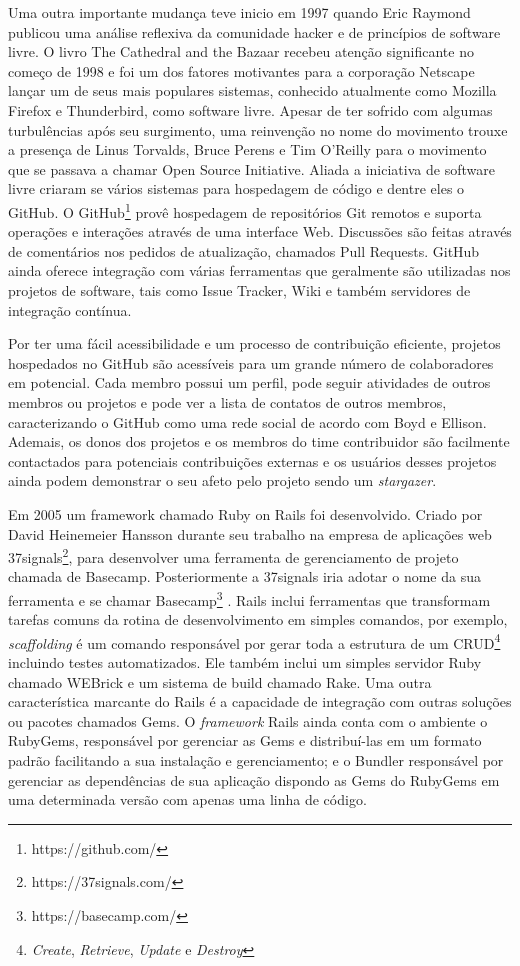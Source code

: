 Uma outra importante mudança teve inicio em 1997 quando Eric Raymond publicou uma análise reflexiva da comunidade hacker e de princípios de software livre. O livro The Cathedral and the Bazaar \cite{Raymond:2001:CBM:365399} recebeu atenção significante no começo de 1998 e foi um dos fatores motivantes para a corporação Netscape lançar um de seus mais populares sistemas, conhecido atualmente como Mozilla Firefox e Thunderbird, como software livre. Apesar de ter sofrido com algumas turbulências após seu surgimento, uma reinvenção no nome do movimento trouxe a presença de Linus Torvalds, Bruce Perens e Tim O'Reilly para o movimento que se passava a chamar Open Source Initiative\cite{osi2012}. Aliada a iniciativa de software livre criaram se vários sistemas para hospedagem de código e dentre eles o GitHub. O GitHub\footnote{https://github.com/} provê hospedagem de repositórios Git remotos e suporta operações e interações através de uma interface Web. Discussões são feitas através de comentários nos pedidos de atualização, chamados Pull Requests. GitHub ainda oferece integração com várias ferramentas que geralmente são utilizadas nos projetos de software, tais como Issue Tracker, Wiki e também servidores de integração contínua.

Por ter uma fácil acessibilidade e um processo de contribuição eficiente, projetos hospedados no GitHub são acessíveis para um grande número de colaboradores em potencial. Cada membro possui um perfil, pode seguir atividades de outros membros ou projetos e pode ver a lista de contatos de outros membros, caracterizando o GitHub como uma rede social de acordo com Boyd e Ellison\cite{2007:00393}. Ademais, os donos dos projetos e os membros do time contribuidor são facilmente contactados para potenciais contribuições externas e os usuários desses projetos ainda podem demonstrar o seu afeto pelo projeto sendo um \textit{stargazer}\cite{Pham:2013:CSU:2486788.2486804}.

	Em 2005 um framework chamado Ruby on Rails foi desenvolvido. Criado por David Heinemeier Hansson durante seu trabalho na empresa de aplicações web 37signals\footnote{https://37signals.com/}, para desenvolver uma ferramenta de gerenciamento de projeto chamada de Basecamp. Posteriormente a 37signals iria adotar o nome da sua ferramenta e se chamar Basecamp\footnote{https://basecamp.com/} \cite{grimmer2006}. Rails inclui ferramentas que transformam tarefas comuns da rotina de desenvolvimento em simples comandos, por exemplo, \textit{scaffolding} é um comando responsável por gerar toda a estrutura de um CRUD\footnote{\textit{Create}, \textit{Retrieve}, \textit{Update} e \textit{Destroy}} incluindo testes automatizados. Ele também inclui um simples servidor Ruby chamado WEBrick e um sistema de build chamado Rake. Uma outra característica marcante do Rails é a capacidade de integração com outras soluções ou pacotes chamados Gems. O \textit{framework} Rails ainda conta com  o ambiente o RubyGems, responsável por gerenciar as Gems e distribuí-las em um formato padrão facilitando a sua instalação e gerenciamento; e o Bundler responsável por gerenciar as dependências de sua aplicação dispondo as Gems do RubyGems em uma determinada versão com apenas uma linha de código.

